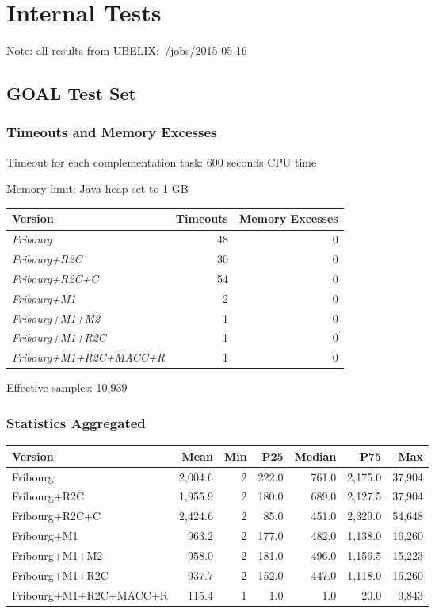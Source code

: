 \section{Internal Tests}

Note: all results from UBELIX:~/jobs/2015-05-16

\subsection{GOAL Test Set}

\subsubsection{Timeouts and Memory Excesses}

Timeout for each complementation task: 600 seconds CPU time

Memory limit: Java heap set to 1 GB

\begin{tabular}{|l|rr|}
\hline
Version & Timeouts & Memory Excesses \\
\hline
\em{Fribourg}               & 48 & 0 \\
\em{Fribourg+R2C}           & 30 & 0 \\
\em{Fribourg+R2C+C}         & 54 & 0 \\  
\em{Fribourg+M1}            &  2 & 0 \\
\em{Fribourg+M1+M2}         &  1 & 0 \\
\em{Fribourg+M1+R2C}        &  1 & 0 \\
\em{Fribourg+M1+R2C+MACC+R} &  1 & 0 \\
\hline
\end{tabular}

Effective samples: 10,939

\subsubsection{Statistics Aggregated}
\begin{table}[ht]
\centering
\begin{tabular}{lrrrrrr}
  \hline
Version & Mean & Min & P25 & Median & P75 & Max \\ 
  \hline
Fribourg & 2,004.6 & 2 & 222.0 & 761.0 & 2,175.0 & 37,904 \\ 
  Fribourg+R2C & 1,955.9 & 2 & 180.0 & 689.0 & 2,127.5 & 37,904 \\ 
  Fribourg+R2C+C & 2,424.6 & 2 & 85.0 & 451.0 & 2,329.0 & 54,648 \\ 
  Fribourg+M1 & 963.2 & 2 & 177.0 & 482.0 & 1,138.0 & 16,260 \\ 
  Fribourg+M1+M2 & 958.0 & 2 & 181.0 & 496.0 & 1,156.5 & 15,223 \\ 
  Fribourg+M1+R2C & 937.7 & 2 & 152.0 & 447.0 & 1,118.0 & 16,260 \\ 
  Fribourg+M1+R2C+MACC+R & 115.4 & 1 & 1.0 & 1.0 & 20.0 & 9,843 \\ 
   \hline
\end{tabular}
\end{table}

